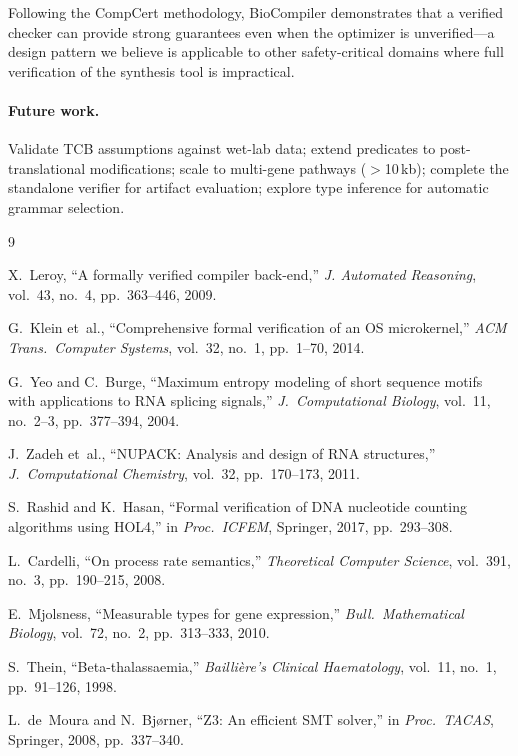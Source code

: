 \documentclass[runningheads]{llncs}
\begin{document}
Following the CompCert methodology, BioCompiler demonstrates that a verified checker can provide strong guarantees even when the optimizer is unverified---a design pattern we believe is applicable to other safety-critical domains where full verification of the synthesis tool is impractical.

\paragraph{Future work.}
Validate TCB assumptions against wet-lab data; extend predicates to post-translational modifications; scale to multi-gene pathways ($>$10\,kb); complete the standalone verifier for artifact evaluation; explore type inference for automatic grammar selection.

\begin{thebibliography}{9}

X.~Leroy,
``A formally verified compiler back-end,''
\emph{J. Automated Reasoning}, vol.~43, no.~4, pp.~363--446, 2009.

G.~Klein et~al.,
``Comprehensive formal verification of an OS microkernel,''
\emph{ACM Trans.\ Computer Systems}, vol.~32, no.~1, pp.~1--70, 2014.

G.~Yeo and C.~Burge,
``Maximum entropy modeling of short sequence motifs with applications to RNA splicing signals,''
\emph{J.\ Computational Biology}, vol.~11, no.~2--3, pp.~377--394, 2004.

J.~Zadeh et~al.,
``NUPACK: Analysis and design of RNA structures,''
\emph{J.\ Computational Chemistry}, vol.~32, pp.~170--173, 2011.

S.~Rashid and K.~Hasan,
``Formal verification of DNA nucleotide counting algorithms using HOL4,''
in \emph{Proc.\ ICFEM}, Springer, 2017, pp.~293--308.

L.~Cardelli,
``On process rate semantics,''
\emph{Theoretical Computer Science}, vol.~391, no.~3, pp.~190--215, 2008.

E.~Mjolsness,
``Measurable types for gene expression,''
\emph{Bull.\ Mathematical Biology}, vol.~72, no.~2, pp.~313--333, 2010.

S.~Thein,
``Beta-thalassaemia,''
\emph{Bailli\`ere's Clinical Haematology}, vol.~11, no.~1, pp.~91--126, 1998.

L.~de~Moura and N.~Bj{\o}rner,
``Z3: An efficient SMT solver,''
in \emph{Proc.\ TACAS}, Springer, 2008, pp.~337--340.


\end{thebibliography}
\end{document}
